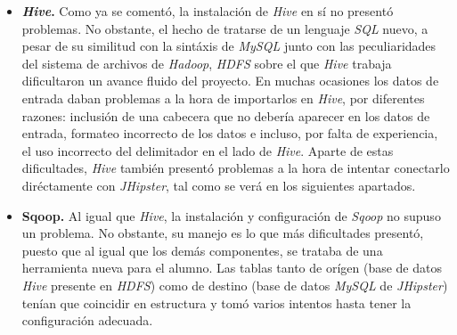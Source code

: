 \begin{itemize}
\item \textbf{\textit{Hive}.} Como ya se comentó, la instalación de \textit{Hive} en sí no presentó problemas. No obstante, el hecho de tratarse de un lenguaje \textit{SQL} nuevo, a pesar de su similitud con la sintáxis de \textit{MySQL} junto con las peculiaridades del sistema de archivos de \textit{Hadoop}, \textit{HDFS} sobre el que \textit{Hive} trabaja dificultaron un avance fluido del proyecto. En muchas ocasiones los datos de entrada daban problemas a la hora de importarlos en \textit{Hive}, por diferentes razones: inclusión de una cabecera que no debería aparecer en los datos de entrada, formateo incorrecto de los datos e incluso, por falta de experiencia, el uso incorrecto del delimitador en el lado de \textit{Hive}. Aparte de estas dificultades, \textit{Hive} también presentó problemas a la hora de intentar conectarlo diréctamente con \textit{JHipster}, tal como se verá en los siguientes apartados.

\item \textbf{Sqoop.} Al igual que \textit{Hive}, la instalación y configuración de \textit{Sqoop} no supuso un problema. No obstante, su manejo es lo que más dificultades presentó, puesto que al igual que los demás componentes, se trataba de una herramienta nueva para el alumno. Las tablas tanto de orígen (base de datos \textit{Hive} presente en \textit{HDFS}) como de destino (base de datos \textit{MySQL} de \textit{JHipster}) tenían que coincidir en estructura y tomó varios intentos hasta tener la configuración adecuada. 	


\end{itemize}
